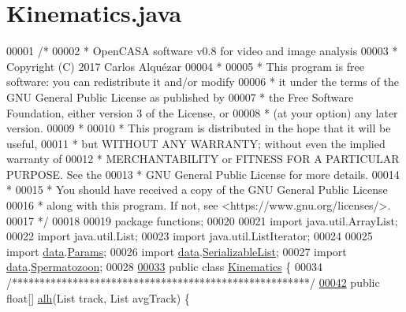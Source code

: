 \hypertarget{_kinematics_8java_source}{}\section{Kinematics.\+java}
\label{_kinematics_8java_source}

\begin{DoxyCode}
00001 \textcolor{comment}{/*}
00002 \textcolor{comment}{ *   OpenCASA software v0.8 for video and image analysis}
00003 \textcolor{comment}{ *   Copyright (C) 2017  Carlos Alquézar}
00004 \textcolor{comment}{ *}
00005 \textcolor{comment}{ *   This program is free software: you can redistribute it and/or modify}
00006 \textcolor{comment}{ *   it under the terms of the GNU General Public License as published by}
00007 \textcolor{comment}{ *   the Free Software Foundation, either version 3 of the License, or}
00008 \textcolor{comment}{ *   (at your option) any later version.}
00009 \textcolor{comment}{ *}
00010 \textcolor{comment}{ *   This program is distributed in the hope that it will be useful,}
00011 \textcolor{comment}{ *   but WITHOUT ANY WARRANTY; without even the implied warranty of}
00012 \textcolor{comment}{ *   MERCHANTABILITY or FITNESS FOR A PARTICULAR PURPOSE.  See the}
00013 \textcolor{comment}{ *   GNU General Public License for more details.}
00014 \textcolor{comment}{ *}
00015 \textcolor{comment}{ *   You should have received a copy of the GNU General Public License}
00016 \textcolor{comment}{ *   along with this program.  If not, see <https://www.gnu.org/licenses/>.}
00017 \textcolor{comment}{*/}    
00018 
00019 \textcolor{keyword}{package }functions;
00020 
00021 \textcolor{keyword}{import} java.util.ArrayList;
00022 \textcolor{keyword}{import} java.util.List;
00023 \textcolor{keyword}{import} java.util.ListIterator;
00024 
00025 \textcolor{keyword}{import} \hyperlink{namespacedata}{data}.\hyperlink{classdata_1_1_params}{Params};
00026 \textcolor{keyword}{import} \hyperlink{namespacedata}{data}.\hyperlink{classdata_1_1_serializable_list}{SerializableList};
00027 \textcolor{keyword}{import} \hyperlink{namespacedata}{data}.\hyperlink{classdata_1_1_spermatozoon}{Spermatozoon};
00028 
\hypertarget{_kinematics_8java_source_l00033}{}\hyperlink{classfunctions_1_1_kinematics}{00033} \textcolor{keyword}{public} \textcolor{keyword}{class }\hyperlink{classfunctions_1_1_kinematics}{Kinematics} \{
00034   \textcolor{comment}{/******************************************************/}
\hypertarget{_kinematics_8java_source_l00042}{}\hyperlink{classfunctions_1_1_kinematics_a8f8221f314e814927fb192ea65f2af4a}{00042}   \textcolor{keyword}{public} \textcolor{keywordtype}{float}[] \hyperlink{classfunctions_1_1_kinematics_a8f8221f314e814927fb192ea65f2af4a}{alh}(List track, List avgTrack) \{

\end{DoxyCode}
